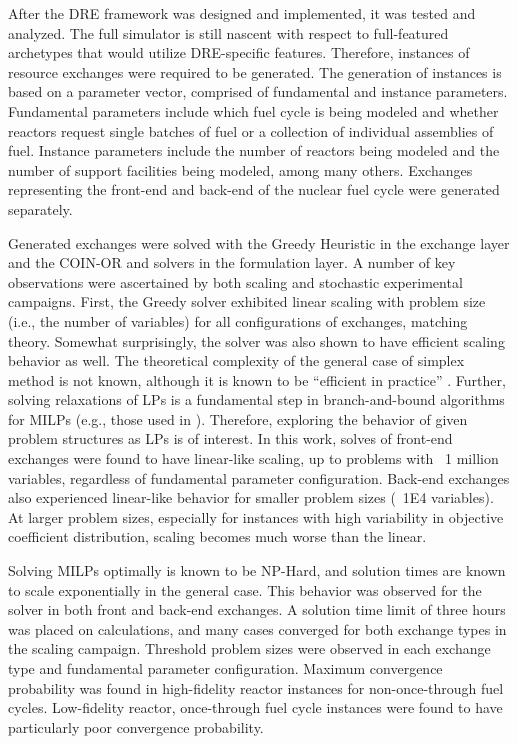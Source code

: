 After the DRE framework was designed and implemented, it was tested and
analyzed. The full \Cyclus simulator is still nascent with respect to
full-featured archetypes that would utilize DRE-specific features. Therefore,
instances of resource exchanges were required to be generated. The generation of
instances is based on a parameter vector, comprised of fundamental and instance
parameters. Fundamental parameters include which fuel cycle is being modeled and
whether reactors request single batches of fuel or a collection of individual
assemblies of fuel. Instance parameters include the number of reactors being
modeled and the number of support facilities being modeled, among many
others. Exchanges representing the front-end and back-end of the nuclear fuel
cycle were generated separately.

Generated exchanges were solved with the Greedy Heuristic in the exchange layer
and the COIN-OR \clp and \cbc solvers in the formulation layer. A number of key
observations were ascertained by both scaling and stochastic experimental
campaigns. First, the Greedy solver exhibited linear scaling with problem size
(i.e., the number of variables) for all configurations of exchanges, matching
theory. Somewhat surprisingly, the \clp solver was also shown to have efficient
scaling behavior as well. The theoretical complexity of the general case of
simplex method is not known, although it is known to be ``efficient in
practice'' \cite{goldfarb1994complexity}. Further, solving relaxations of LPs is
a fundamental step in branch-and-bound algorithms for MILPs (e.g., those used in
\cbc). Therefore, exploring the behavior of given problem structures as LPs is of
interest. In this work, \clp solves of front-end exchanges were found to have
linear-like scaling, up to problems with ~1 million variables, regardless of
fundamental parameter configuration. Back-end exchanges also experienced
linear-like behavior for smaller problem sizes (~1E4 variables). At larger
problem sizes, especially for instances with high variability in objective
coefficient distribution, scaling becomes much worse than the linear.

Solving MILPs optimally is known to be NP-Hard, and solution times are known to
scale exponentially in the general case. This behavior was observed for the \cbc
solver in both front and back-end exchanges. A solution time limit of three
hours was placed on \cbc calculations, and many cases converged for both exchange
types in the scaling campaign. Threshold problem sizes were observed in each
exchange type and fundamental parameter configuration. Maximum convergence
probability was found in high-fidelity reactor instances for non-once-through
fuel cycles. Low-fidelity reactor, once-through fuel cycle instances were found
to have particularly poor convergence probability. 

